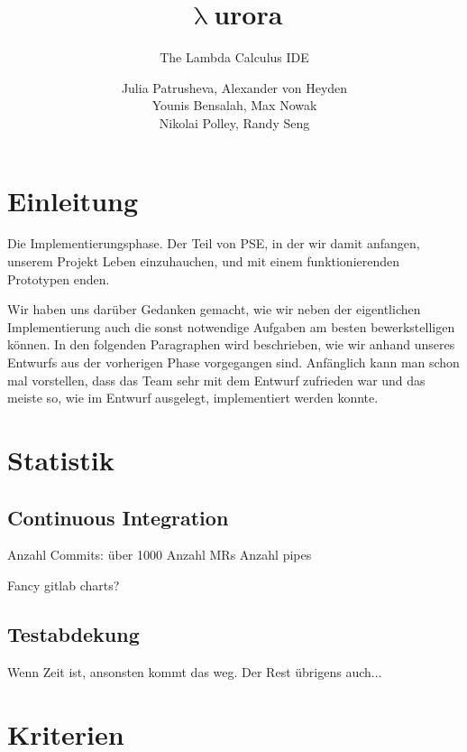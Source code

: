 \documentclass[parskip=full,11pt,twoside]{scrartcl}
\title{\textbf{$\uplambda$}urora}
\subtitle{The Lambda Calculus IDE}
\author{Julia Patrusheva, Alexander von Heyden\\
Younis Bensalah, Max Nowak\\
Nikolai Polley, Randy Seng}
\begin{document}
\maketitle
\tableofcontents
\newpage
\section{Einleitung}
Die Implementierungsphase.
Der Teil von PSE, in der wir damit anfangen, unserem Projekt Leben einzuhauchen, und mit einem funktionierenden Prototypen enden.
\newline

Wir haben uns darüber Gedanken gemacht, wie wir neben der eigentlichen Implementierung auch die sonst notwendige Aufgaben am besten bewerkstelligen können.
In den folgenden Paragraphen wird beschrieben, wie wir anhand unseres Entwurfs aus der vorherigen Phase vorgegangen sind.
Anfänglich kann man schon mal vorstellen, dass das Team sehr mit dem Entwurf zufrieden war und das meiste so, wie im Entwurf ausgelegt, implementiert werden konnte.
\newline
\newpage

\section{Statistik}

\subsection{Continuous Integration}
Anzahl Commits: über 1000\newline
Anzahl MRs\newline
Anzahl pipes\newline

Fancy gitlab charts?

\subsection{Testabdekung}
Wenn Zeit ist, ansonsten kommt das weg.
Der Rest übrigens auch...

\newpage

\section{Kriterien}
\end{document}
